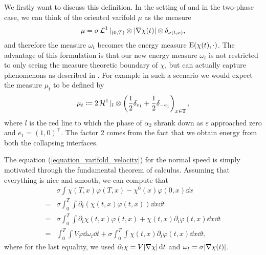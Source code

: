 We firstly want to discuss this definition. In the setting of 
 and in the two-phase case, we can think of 
the 
oriented varifold $ \mu $ as the measure 
\begin{equation} 
	\label{equation_simple_varifold}
	\mu =
	\sigma \operatorname{\mathcal{L}}^{ 1 } |_{ 
		( 0 , T ) } \otimes \abs{ \nabla \chi  ( t ) } 
	\otimes \delta_{ \nu ( t , x ) }, 
\end{equation}
and therefore the measure $ \omega_{ t } $ 
becomes the energy measure $ \operatorname{E} ( \chi ( t ) , \cdot ) $.
The advantage of this formulation is that our new energy measure $ \omega_{ t } 
$ is not restricted to only seeing the measure theoretic boundary of $ \chi $, 
but can actually capture phenomenons as described in 
.
For example in such a scenario we would expect the measure $ \mu_{ t } $ to be 
defined by
\begin{equation}
	\label{equation_mu_in_figure}
	\mu_{ t } \coloneqq
	2 \operatorname{\mathcal{H}}^{ 1 } |_{ l } \otimes \left(  \frac{ 1 }{ 2 } \delta_{ e_{ 1 } } + 
	 \frac{ 1 }{ 2 }\delta_{ -e_{ 1 } }\right)_{ x \in \operatorname{\mathbb{T}} } ,
\end{equation}
where $ l $ is the red line to which the phase 
of $ \alpha_{ 2 } $ shrank down as $ \varepsilon $ approached zero and $ e_{ 1 
} = ( 1 , 0 )^{ \top } $. The factor 
2 comes from the fact that we obtain energy from both the collapsing interfaces.

The equation (\ref{equation_varifold_velocity}) for the  normal speed is simply 
motivated through 
the fundamental theorem of calculus. Assuming that everything is nice and 
smooth, we can compute that 
\begin{align*}
	&\sigma \int
	\chi ( T , x ) \varphi ( T , x ) - \chi^{ 0 } ( x ) \varphi ( 0 , x )
	\dd{ x }
	\\
	={} &
	\sigma \int_{ 0 }^{ T }
	\int
	\partial_{ t } \left(
	\chi ( t , x ) \varphi ( t , x )
	\right)
	\dd{ x }
	\dd{ t }
	\\
	={} &
	\sigma \int_{ 0 }^{ T }
	\int
	\partial_{ t } \chi ( t , x ) \varphi ( t , x )
	+
	\chi ( t , x ) \partial_{ t } \varphi ( t , x )
	\dd{ x }
	\dd{ t }
	\\
	={} &
	\int_{ 0 }^{ T }
	\int
	V \varphi 
	\dd{ \omega_{ t} }
	\dd{ t }
	+
	\sigma \int_{ 0 }^{ T }
	\int
	\chi ( t , x )
	\partial_{ t } \varphi ( t , x )
	\dd{ x }
	\dd{ t },
\end{align*}
where for the last equality, we used $ \partial_{ t } \chi = V \abs{ \nabla 
	\chi } \dd{ t } $ and $ \omega_{ t } = \sigma \abs{ \nabla \chi ( t ) } $.

